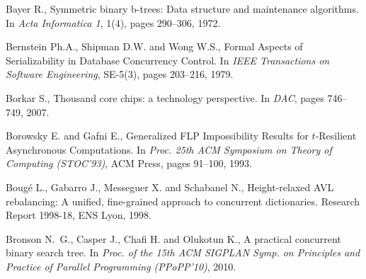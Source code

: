 \begin{thebibliography}{99}
{
Bayer R.,
\newblock Symmetric binary b-trees: Data structure and maintenance algorithms.
\newblock In {\em Acta Informatica 1}, 1(4), pages 290--306, 1972.



Bernstein Ph.A., Shipman D.W. and Wong W.S., 
Formal Aspects of Serializability in Database Concurrency Control. 
In {\it IEEE Transactions on Software Engineering}, SE-5(3), pages 203--216, 1979. 


Borkar S.,
\newblock Thousand core chips: a technology perspective.
\newblock In {\em DAC}, pages 746--749, 2007.





Borowsky E. and Gafni E., 
Generalized FLP Impossibility Results for $t$-Resilient Asynchronous
Computations.
In {\it Proc. 25th ACM  Symposium on Theory of Computing (STOC'93)}, 
ACM Press, pages 91--100, 1993.



Boug\'e L., Gabarro J., Messeguer X. and Schabanel N.,
\newblock Height-relaxed {AVL} rebalancing: A unified, fine-grained approach to
  concurrent dictionaries.
\newblock Research Report 1998-18, ENS Lyon, 1998.






Bronson N.~G., Casper J., Chafi H. and Olukotun K.,
\newblock A practical concurrent binary search tree.
\newblock In {\em Proc. of the 15th ACM SIGPLAN Symp. on Principles and
  Practice of Parallel Programming (PPoPP'10)}, 2010.



}
\end{thebibliography}
